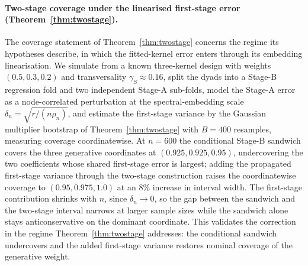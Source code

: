 \documentclass[12pt]{article}
\newcommand{\1}{\mathbf{1}}
\begin{document}
\paragraph{Two-stage coverage under the linearised first-stage error (Theorem~\ref{thm:twostage}).}
The coverage statement of Theorem~\ref{thm:twostage} concerns the regime its hypotheses describe, in
which the fitted-kernel error enters through its embedding linearisation. We simulate from a known
three-kernel design with weights $(0.5,0.3,0.2)$ and transversality $\gamma_S\approx0.16$, split the
dyads into a Stage-B regression fold and two independent Stage-A sub-folds, model the Stage-A error
as a node-correlated perturbation at the spectral-embedding scale $\delta_n=\sqrt{r/(n\rho_n)}$, and
estimate the first-stage variance by the Gaussian multiplier bootstrap of
Theorem~\ref{thm:twostage} with $B=400$ resamples, measuring coverage coordinatewise. At $n=600$ the
conditional Stage-B sandwich covers the three generative coordinates at $(0.925,0.925,0.95)$,
undercovering the two coefficients whose shared first-stage error is largest; adding the propagated
first-stage variance through the two-stage construction raises the coordinatewise coverage to
$(0.95,0.975,1.0)$ at an $8\%$ increase in interval width. The first-stage contribution shrinks with
$n$, since $\delta_n\to0$, so the gap between the sandwich and the two-stage interval narrows at
larger sample sizes while the sandwich alone stays anticonservative on the dominant coordinate. This
validates the correction in the regime Theorem~\ref{thm:twostage} addresses: the conditional
sandwich undercovers and the added first-stage variance restores nominal coverage of the generative
weight.
\end{document}
